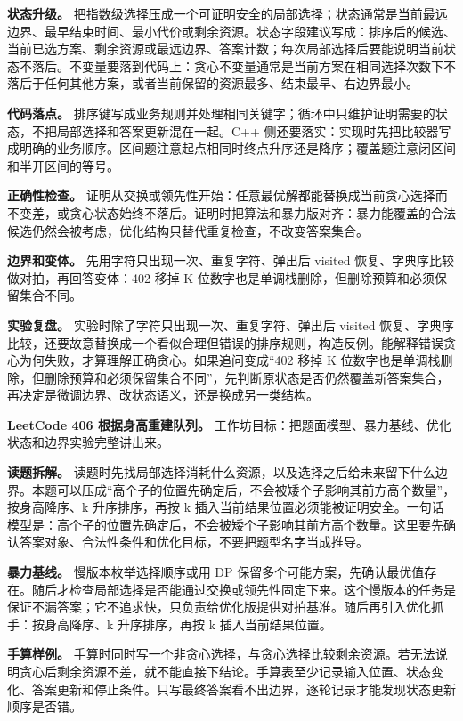 \textbf{状态升级。} 把指数级选择压成一个可证明安全的局部选择；状态通常是当前最远边界、最早结束时间、最小代价或剩余资源。状态字段建议写成：排序后的候选、当前已选方案、剩余资源或最远边界、答案计数；每次局部选择后要能说明当前状态不落后。不变量要落到代码上：贪心不变量通常是当前方案在相同选择次数下不落后于任何其他方案，或者当前保留的资源最多、结束最早、右边界最小。

\textbf{代码落点。} 排序键写成业务规则并处理相同关键字；循环中只维护证明需要的状态，不把局部选择和答案更新混在一起。C++ 侧还要落实：实现时先把比较器写成明确的业务顺序。区间题注意起点相同时终点升序还是降序；覆盖题注意闭区间和半开区间的等号。

\textbf{正确性检查。} 证明从交换或领先性开始：任意最优解都能替换成当前贪心选择而不变差，或贪心状态始终不落后。证明时把算法和暴力版对齐：暴力能覆盖的合法候选仍然会被考虑，优化结构只替代重复检查，不改变答案集合。

\textbf{边界和变体。} 先用字符只出现一次、重复字符、弹出后 visited 恢复、字典序比较做对拍，再回答变体：402 移掉 K 位数字也是单调栈删除，但删除预算和必须保留集合不同。

\textbf{实验复盘。} 实验时除了字符只出现一次、重复字符、弹出后 visited 恢复、字典序比较，还要故意替换成一个看似合理但错误的排序规则，构造反例。能解释错误贪心为何失败，才算理解正确贪心。如果追问变成“402 移掉 K 位数字也是单调栈删除，但删除预算和必须保留集合不同”，先判断原状态是否仍然覆盖新答案集合，再决定是微调边界、改状态语义，还是换成另一类结构。

\noindent\textbf{LeetCode 406 根据身高重建队列。} 工作坊目标：把题面模型、暴力基线、优化状态和边界实验完整讲出来。

\textbf{读题拆解。} 读题时先找局部选择消耗什么资源，以及选择之后给未来留下什么边界。本题可以压成“高个子的位置先确定后，不会被矮个子影响其前方高个数量”，按身高降序、k 升序排序，再按 k 插入当前结果位置必须能被证明安全。一句话模型是：高个子的位置先确定后，不会被矮个子影响其前方高个数量。这里要先确认答案对象、合法性条件和优化目标，不要把题型名字当成推导。

\textbf{暴力基线。} 慢版本枚举选择顺序或用 DP 保留多个可能方案，先确认最优值存在。随后才检查局部选择是否能通过交换或领先性固定下来。这个慢版本的任务是保证不漏答案；它不追求快，只负责给优化版提供对拍基准。随后再引入优化抓手：按身高降序、k 升序排序，再按 k 插入当前结果位置。

\textbf{手算样例。} 手算时同时写一个非贪心选择，与贪心选择比较剩余资源。若无法说明贪心后剩余资源不差，就不能直接下结论。手算表至少记录输入位置、状态变化、答案更新和停止条件。只写最终答案看不出边界，逐轮记录才能发现状态更新顺序是否错。

